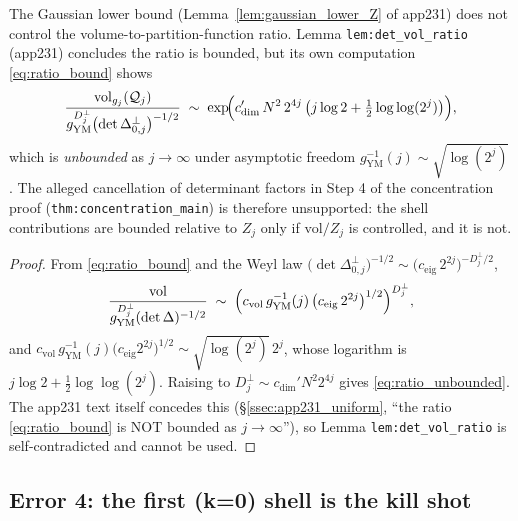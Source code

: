 \begin{theorem}[Error 3]
\label{thm:app231_error3}
The Gaussian lower bound (Lemma~\ref{lem:gaussian_lower_Z} of app231)
does not control the volume-to-partition-function ratio. Lemma
\texttt{lem:det\_vol\_ratio} (app231) concludes the ratio is bounded,
but its own computation
\eqref{eq:ratio_bound} shows
\begin{equation}
\label{eq:ratio_unbounded}
  \frac{\mathrm{vol}_{g_{j}}(\mathcal{Q}_{j})}{
  g_{\mathrm{YM}}^{D_{j}^{\perp}}\bigl(\det\Delta_{0,j}^{\perp}\bigr)^{-1/2}}
  \;\sim\;\exp\!\Bigl(c_{\dim}'\,N^{2}\,2^{4j}\,\bigl(j\log 2
  +\tfrac{1}{2}\log\log(2^{j})\bigr)\Bigr),
\end{equation}
which is \emph{unbounded} as $j\to\infty$ under asymptotic freedom
$g_{\mathrm{YM}}^{-1}(j)\sim\sqrt{\log(2^{j})}$. The alleged cancellation
of determinant factors in Step 4 of the concentration proof
(\texttt{thm:concentration\_main}) is therefore unsupported: the shell
contributions are bounded relative to $Z_{j}$ only if
$\mathrm{vol}/Z_{j}$ is controlled, and it is not.
\end{theorem}

\begin{proof}
From \eqref{eq:ratio_bound} and the Weyl law
$\bigl(\det\Delta_{0,j}^{\perp}\bigr)^{-1/2}\sim\bigl(c_{\mathrm{eig}}\,2^{2j}\bigr)^{-D_{j}^{\perp}/2}$,
\begin{equation*}
  \frac{\mathrm{vol}}{g_{\mathrm{YM}}^{D_{j}^{\perp}}(\det\Delta)^{-1/2}}
  \;\sim\;\Bigl(c_{\mathrm{vol}}\,g_{\mathrm{YM}}^{-1}(j)\,
  \bigl(c_{\mathrm{eig}}\,2^{2j}\bigr)^{1/2}\Bigr)^{D_{j}^{\perp}},
\end{equation*}
and $c_{\mathrm{vol}}\,g_{\mathrm{YM}}^{-1}(j)\bigl(c_{\mathrm{eig}}2^{2j}\bigr)^{1/2}
\sim \sqrt{\log(2^{j})}\,2^{j}$, whose logarithm is $j\log 2 +
\frac{1}{2}\log\log(2^{j})$. Raising to $D_{j}^{\perp}\sim c_{\dim}'N^{2}2^{4j}$
gives \eqref{eq:ratio_unbounded}. The app231 text itself concedes this
(\S\ref{ssec:app231_uniform}, ``the ratio \eqref{eq:ratio_bound} is NOT
bounded as $j\to\infty$''), so Lemma \texttt{lem:det\_vol\_ratio} is
self-contradicted and cannot be used.
\end{proof}

\subsection{Error 4: the first (k=0) shell is the kill shot}

